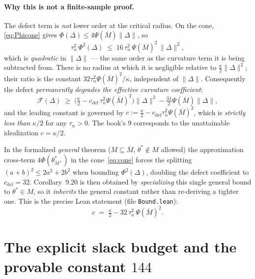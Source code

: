 \documentclass[11pt]{article}
\theoremstyle{definition}
\newcommand{\thetast}{\theta^{*}}
\newcommand{\Mbar}{\overline{M}}
\newcommand{\Mperp}{M^{\perp}}
\newcommand{\PsM}{\Psi(\Mbar)}
\newcommand{\norm}[1]{\lVert #1 \rVert}
\newcommand{\Fcal}{\mathcal{F}}
\begin{document}
\paragraph{Why this is not a finite-sample proof.} The defect term is \emph{not} lower order at the
critical radius. On the cone, \eqref{eq:Phicone} gives $\Phi(\Delta)\le 4\PsM\norm{\Delta}$, so
\begin{equation}\label{eq:defectquad}
  \tau_n^2\,\Phi^2(\Delta) \;\le\; 16\,\tau_n^2\,\PsM^2\,\norm{\Delta}^2 ,
\end{equation}
which is \emph{quadratic} in $\norm{\Delta}$ --- the same order as the curvature term it is being
subtracted from. There is no radius at which it is negligible relative to $\tfrac{\kappa}{2}\norm{\Delta}^2$;
their ratio is the constant $32\tau_n^2\PsM^2/\kappa$, independent of $\norm{\Delta}$. Consequently the
defect \emph{permanently degrades the effective curvature coefficient}:
\begin{equation}\label{eq:ceff}
  \Fcal(\Delta) \;\ge\; \Big(\tfrac{\kappa}{2} - c_{\mathrm{def}}\,\tau_n^2\PsM^2\Big)\norm{\Delta}^2
                 - \tfrac{3\lambda}{2}\PsM\norm{\Delta},
\end{equation}
and the leading constant is governed by $c := \tfrac{\kappa}{2}-c_{\mathrm{def}}\tau_n^2\PsM^2$, which is
\emph{strictly less than} $\kappa/2$ for any $\tau_n>0$. The book's $9$ corresponds to the unattainable
idealization $c=\kappa/2$.

In the formalized \emph{general} theorem ($M\subseteq\Mbar$, $\thetast\notin M$ allowed) the
approximation cross-term $4\Phi(\thetast_{\Mperp})$ in the cone~\eqref{eq:cone} forces the splitting
$(a+b)^2\le 2a^2+2b^2$ when bounding $\Phi^2(\Delta)$, doubling the defect coefficient to
$c_{\mathrm{def}}=32$. Corollary~9.20 is then obtained by \emph{specializing} this single general bound
to $\thetast\in M$, so it \emph{inherits} the general constant rather than re-deriving a tighter one.
This is the precise Lean statement (file \texttt{Bound.lean}):
\[
  c \;=\; \tfrac{\kappa}{2} - 32\,\tau_n^2\,\PsM^2 .
\]

\section{The explicit slack budget and the provable constant $144$}\label{sec:fix}
\end{document}
